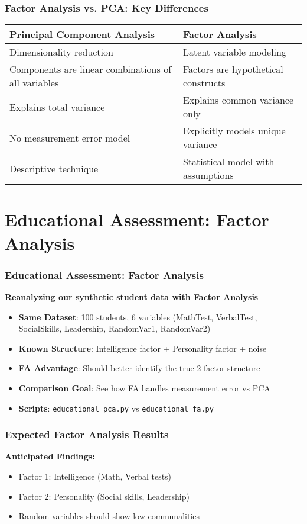 \documentclass[aspectratio=169]{beamer}
\begin{document}
\begin{frame}[fragile]
    \frametitle{Factor Analysis vs. PCA: Key Differences}
    \begin{center}
    \begin{tabular}{|p{5cm}|p{5cm}|}
    \hline
    \textbf{Principal Component Analysis} & \textbf{Factor Analysis} \\
    \hline
    Dimensionality reduction & Latent variable modeling \\
    \hline
    Components are linear combinations of all variables & Factors are hypothetical constructs \\
    \hline
    Explains total variance & Explains common variance only \\
    \hline
    No measurement error model & Explicitly models unique variance \\
    \hline
    Descriptive technique & Statistical model with assumptions \\
    \hline
    \end{tabular}
    \end{center}
\end{frame}

\section{Educational Assessment: Factor Analysis}

\begin{frame}
    \frametitle{Educational Assessment: Factor Analysis}
    \textbf{Reanalyzing our synthetic student data with Factor Analysis}
    \begin{itemize}
        \item \textbf{Same Dataset}: 100 students, 6 variables (MathTest, VerbalTest, SocialSkills, Leadership, RandomVar1, RandomVar2) \pause
        \item \textbf{Known Structure}: Intelligence factor + Personality factor + noise \pause
        \item \textbf{FA Advantage}: Should better identify the true 2-factor structure \pause
        \item \textbf{Comparison Goal}: See how FA handles measurement error vs PCA \pause
        \item \textbf{Scripts}: \texttt{educational\_pca.py} vs \texttt{educational\_fa.py}
    \end{itemize}
\end{frame}

\begin{frame}
    \frametitle{Expected Factor Analysis Results}
    \textbf{Anticipated Findings:}
    \begin{itemize}
        \item Factor 1: Intelligence (Math, Verbal tests) \pause
        \item Factor 2: Personality (Social skills, Leadership) \pause
        \item Random variables should show low communalities \pause
    \end{itemize}
\end{frame}
\end{document}
